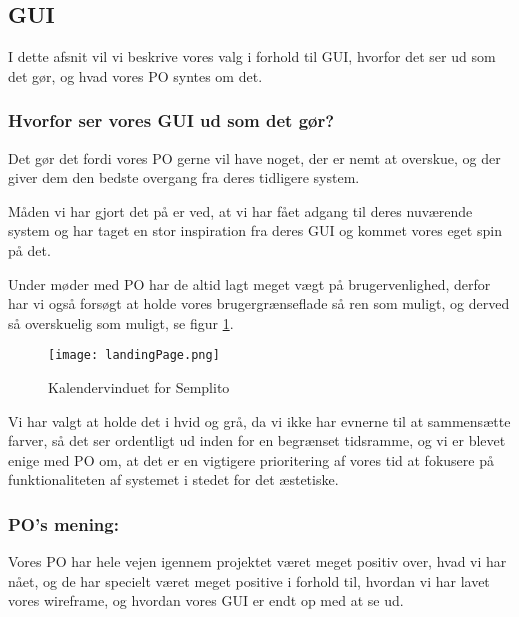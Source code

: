 \subsection{GUI}
\label{GUI}
I dette afsnit vil vi beskrive vores valg i forhold til GUI, hvorfor det ser ud som det gør, og hvad vores PO syntes om det.

\subsubsection{Hvorfor ser vores GUI ud som det gør?}
Det gør det fordi vores PO gerne vil have noget, der er nemt at overskue, og der giver dem den bedste overgang fra deres tidligere system.

Måden vi har gjort det på er ved, at vi har fået adgang til deres nuværende system og har taget en stor inspiration fra deres GUI og kommet vores eget spin på det.

Under møder med PO har de altid lagt meget vægt på brugervenlighed, derfor har vi også forsøgt at holde vores brugergrænseflade så ren som muligt, og derved så overskuelig som muligt, se figur \ref{GUI:Screenshot}.

\begin{figure}[H]
    \caption{Kalendervinduet for Semplito}
    \centering
        \texttt{[image: landingPage.png]}
    \label{GUI:Screenshot}
\end{figure}

Vi har valgt at holde det i hvid og grå, da vi ikke har evnerne til at sammensætte farver, så det ser ordentligt ud inden for en begrænset tidsramme, og vi er blevet enige med PO om, at det er en vigtigere prioritering af vores tid at fokusere på funktionaliteten af systemet i stedet for det æstetiske.

\subsubsection{PO's mening:}
Vores PO har hele vejen igennem projektet været meget positiv over, hvad vi har nået, og de har specielt været meget positive i forhold til, hvordan vi har lavet vores wireframe, og hvordan vores GUI er endt op med at se ud.